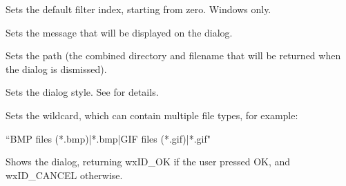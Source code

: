 \label{wxfiledialogsetfilterindex}


Sets the default filter index, starting from zero. Windows only.

\label{wxfiledialogsetmessage}


Sets the message that will be displayed on the dialog.

\label{wxfiledialogsetpath}


Sets the path (the combined directory and filename that will be returned when the dialog is dismissed).

\label{wxfiledialogsetstyle}


Sets the dialog style. See  for details.

\label{wxfiledialogsetwildcard}


Sets the wildcard, which can contain multiple file types, for example:

``BMP files (*.bmp)|*.bmp|GIF files (*.gif)|*.gif"

\label{wxfiledialogshowmodal}


Shows the dialog, returning wxID\_OK if the user pressed OK, and wxID\_CANCEL
otherwise.


